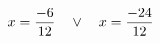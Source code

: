 \documentclass[preview]{standalone}
\begin{document}
\begin{align*}
\special{dvisvgm:raw <g id='unique000'>}x=\frac{-6}{12} \quad \lor \quad x=\frac{-24}{12}\special{dvisvgm:raw </g>}
\end{align*}
\end{document}

